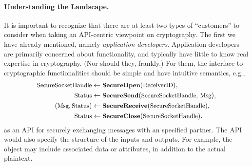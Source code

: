 \paragraph{Understanding the Landscape. }
It is important to recognize that there are at least two types of ``customers''
to consider when taking an API-centric viewpoint on cryptography. The first we
have already mentioned, namely \emph{application developers}. Application developers
are primarily concerned about functionality, and typically have little
to know real expertise in cryptography.  (Nor should they, frankly.)
%
%
For them, the interface to cryptographic functionalities should be
simple and have intuitive semantics, e.g.,
\begin{align*}
\textrm{\small SecureSocketHandle}&\gets\textrm{\small\bf SecureOpen}(\textrm{\small ReceiverID}), \\
\textrm{\small Status}&\gets\textrm{\small\bf SecureSend}(\textrm{\small SecureSocketHandle, Msg}),\\
  (\textrm{\small Msg}, \textrm{\small Status}) &\gets\textrm{\small\bf SecureReceive}(\textrm{\small SecureSocketHandle}), \\
\textrm{\small Status}&\gets\textrm{\small\bf SecureClose}(\textrm{\small SecureSocketHandle}).
\end{align*}
%
as an API for securely exchanging messages with an specified partner.
The API would also specify the structure of the inputs and outputs.
For example, the  object may include associated data or attributes, in addition
to the actual plaintext.
%


